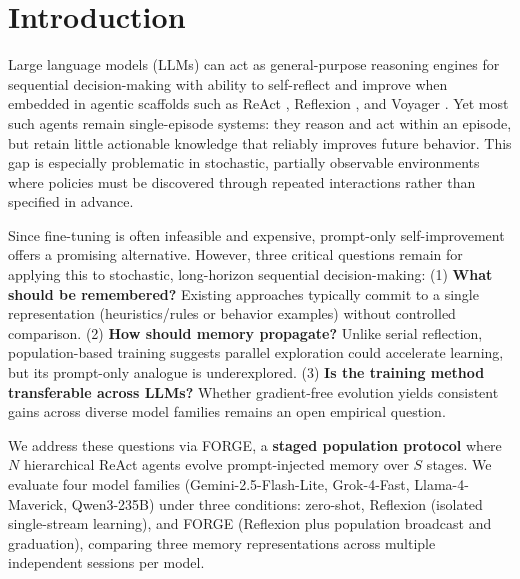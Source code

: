 \documentclass[sigconf]{acmart}
\begin{document}

\maketitle


\section{Introduction}

Large language models (LLMs) can act as general-purpose reasoning engines for sequential decision-making with ability to self-reflect and improve when embedded in agentic scaffolds such as ReAct \citep{yao2023react}, Reflexion \citep{shinn2023reflexion}, and Voyager \citep{wang2023voyager}. Yet most such agents remain single-episode systems: they reason and act within an episode, but retain little actionable knowledge that reliably improves future behavior. This gap is especially problematic in stochastic, partially observable environments where policies must be discovered through repeated interactions rather than specified in advance.

Since fine-tuning is often infeasible and expensive, prompt-only self-improvement offers a promising alternative. However, three critical questions remain for applying this to stochastic, long-horizon sequential decision-making: (1) \textbf{What should be remembered?} Existing approaches typically commit to a single representation (heuristics/rules or behavior examples) without controlled comparison. (2) \textbf{How should memory propagate?} Unlike serial reflection, population-based training suggests parallel exploration could accelerate learning, but its prompt-only analogue is underexplored. (3) \textbf{Is the training method transferable across LLMs?} Whether gradient-free evolution yields consistent gains across diverse model families remains an open empirical question. 

We address these questions via FORGE, a \textbf{staged population protocol} where $N$ hierarchical ReAct agents evolve prompt-injected memory over $S$ stages. We evaluate four model families (Gemini-2.5-Flash-Lite, Grok-4-Fast, Llama-4-Maverick, Qwen3-235B) under three conditions: zero-shot, Reflexion \citep{shinn2023reflexion} (isolated single-stream learning), and FORGE (Reflexion plus population broadcast and graduation), comparing three memory representations across multiple independent sessions per model.
\end{document}
